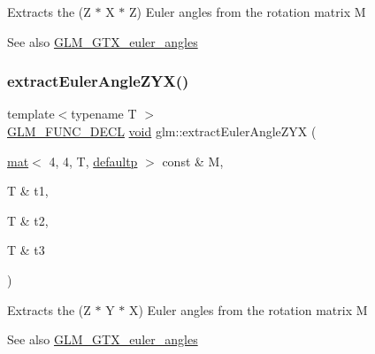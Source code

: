 Extracts the (Z $\ast$ X $\ast$ Z) Euler angles from the rotation matrix M \begin{DoxySeeAlso}{See also}
\hyperlink{group__gtx__euler__angles}{G\+L\+M\+\_\+\+G\+T\+X\+\_\+euler\+\_\+angles} 
\end{DoxySeeAlso}
\mbox{\label{group__gtx__euler__angles_ga2d6c11a4abfa60c565483cee2d3f7665}} 
\subsubsection{\texorpdfstring{extract\+Euler\+Angle\+Z\+Y\+X()}{extractEulerAngleZYX()}}
{\footnotesize\ttfamily template$<$typename T $>$ \\
\hyperlink{setup_8hpp_ab2d052de21a70539923e9bcbf6e83a51}{G\+L\+M\+\_\+\+F\+U\+N\+C\+\_\+\+D\+E\+CL} \hyperlink{_s_d_l__opengles2__gl2ext_8h_ae5d8fa23ad07c48bb609509eae494c95}{void} glm\+::extract\+Euler\+Angle\+Z\+YX (\begin{DoxyParamCaption}\item[{\hyperlink{structglm_1_1mat}{mat}$<$ 4, 4, T, \hyperlink{namespaceglm_a36ed105b07c7746804d7fdc7cc90ff25a9d21ccd8b5a009ec7eb7677befc3bf51}{defaultp} $>$ const \&}]{M,  }\item[{T \&}]{t1,  }\item[{T \&}]{t2,  }\item[{T \&}]{t3 }\end{DoxyParamCaption})}

Extracts the (Z $\ast$ Y $\ast$ X) Euler angles from the rotation matrix M \begin{DoxySeeAlso}{See also}
\hyperlink{group__gtx__euler__angles}{G\+L\+M\+\_\+\+G\+T\+X\+\_\+euler\+\_\+angles} 
\end{DoxySeeAlso}
\mbox{\label{group__gtx__euler__angles_gafdfa880a64b565223550c2d3938b1aeb}} 
